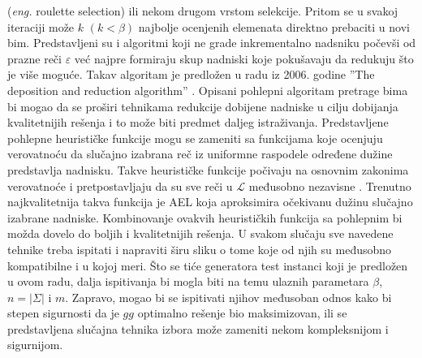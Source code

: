 \documentclass[12pt,oneside]{memoir}
\begin{document}
(\textit{eng.} roulette selection) ili nekom drugom vrstom selekcije.
Pritom se u svakoj iteraciji može $k$ $(k<\beta)$ najbolje ocenjenih elemenata
direktno prebaciti u novi bim.
Predstavljeni su i algoritmi koji ne grade inkrementalno nadsniku počevši 
od prazne reči $\varepsilon$ već najpre formiraju skup nadniski
koje pokušavaju da redukuju što je više moguće. Takav algoritam je predložen
u radu iz 2006. godine ''The deposition and reduction algorithm'' \cite{SCSSBetterSolution}.
Opisani pohlepni algoritam pretrage bima bi mogao da se proširi tehnikama redukcije dobijene
nadniske u cilju dobijanja kvalitetnijih rešenja i to može biti predmet daljeg
istraživanja. 
Predstavljene pohlepne heurističke funkcije mogu se zameniti
sa funkcijama koje ocenjuju verovatnoću da slučajno izabrana reč iz uniformne 
raspodele  određene dužine predstavlja nadnisku.
Takve heurističke funkcije počivaju na osnovnim zakonima verovatnoće i pretpostavljaju
da su sve reči u $\mathcal{L}$ međusobno nezavisne \cite{SCSBS}.
Trenutno najkvalitetnija takva funkcija je AEL koja aproksimira
očekivanu dužinu slučajno izabrane nadniske.
Kombinovanje ovakvih heurističkih funkcija sa pohlepnim bi možda dovelo
do boljih i kvalitetnijih rešenja.
U svakom slučaju sve navedene tehnike treba ispitati i napraviti širu sliku
o tome koje od njih su međusobno kompatibilne i u kojoj meri.
Što se tiće generatora test instanci koji je predložen u ovom radu,
dalja ispitivanja bi mogla biti na temu ulaznih parametara $\beta$, $n=|\Sigma|$ i $m$.
Zapravo, mogao bi se ispitivati njihov međusoban odnos
kako bi stepen sigurnosti da je $gg$ optimalno rešenje bio maksimizovan,
ili se predstavljena slučajna tehnika izbora može zameniti nekom kompleksnijom
i sigurnijom. 

% 


\literatura

\backmatter
\end{document}
